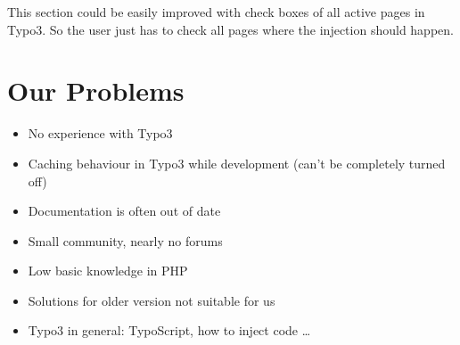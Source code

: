 \documentclass{article}
\begin{document}
This section could be easily improved with check boxes of all active pages in Typo3. So the user just has to check all pages where the injection should happen.


\section{Our Problems}
\begin{itemize}
	\item No experience with Typo3
	\item Caching behaviour in Typo3 while development (can't be completely turned off)
	\item Documentation is often out of date
	\item Small community, nearly no forums
	\item Low basic knowledge in PHP
	\item Solutions for older version not suitable for us
	\item Typo3 in general: TypoScript, how to inject code \dots
\end{itemize}
\end{document}
